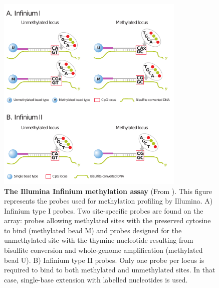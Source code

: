\begin{figure}[H]
    \centering
    \includegraphics[width=0.8\textwidth]{Figures/Intro/Illumina_methylation2.pdf}
    \caption[The Illumina Infinium methylation assay]{\textbf{The Illumina Infinium methylation assay} (From \cite{Illumina_Methylation_infinium}). This figure represents the probes used for methylation profiling by Illumina. A) Infinium type I probes. Two site-specific probes are found on the array: probes allowing methylated sites with the preserved cytosine to bind (methylated bead M) and probes designed for the unmethylated site with the thymine nucleotide resulting from bisulfite conversion and whole-genome amplification (methylated bead U). B) Infinium type II probes. Only one probe per locus is required to bind to both methylated and unmethylated sites. In that case, single-base extension with labelled nucleotides is used.}
    \label{fig:intro_methylation}
\end{figure}

